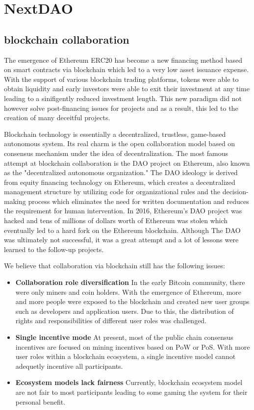 \section{NextDAO}
\subsection{blockchain collaboration}
The emergence of Ethereum ERC20 has become a new financing method based on smart contracts via blockchain which led to a very low asset issuance expense. With the support of various blockchain trading platforms, tokens were able to obtain liquidity and early investors were able to exit their investment at any time leading to a sinifigently reduced investment length. This new paradigm did not however solve post-financing issues for projects and as a result, this led to the creation of many deceitful projects.

Blockchain technology is essentially a decentralized, trustless, game-based autonomous system. Its real charm is the open collaboration model based on consensus mechanism under the idea of decentralization. The most famous attempt at blockchain collaboration is the DAO project on Ethereum, also known as the "decentralized autonomous organization." The DAO ideology is derived from equity financing technology on Ethereum, which creates a decentralized management structure by utilizing code for organizational rules and the decision-making process which eliminates the need for written documentation and reduces the requirement for human intervention. In 2016, Ethereum's DAO project was hacked and tens of millions of dollars worth of Ethereum was stolen which eventually led to a hard fork on the Ethereum blockchain. Although The DAO was ultimately not successful, it was a great attempt and a lot of lessons were learned to the follow-up projects.

We believe that collaboration via blockchain still has the following issues:
\begin{itemize}
	\item \textbf{Collaboration role diversification}
	In the early Bitcoin community, there were only miners and coin holders. With the emergence of Ethereum, more and more people were exposed to the blockchain and created new user groups such as developers and application users. Due to this, the distribution of rights and responsibilities of different user roles was challenged.
	\item \textbf{Single incentive mode}
	At present, most of the public chain consensus incentives are focused on mining incentives based on PoW or PoS. With more user roles within a blockchain ecosystem, a single incentive model cannot adequetly incentive all participants.
	\item \textbf{Ecosystem models lack fairness}
	Currently, blockchain ecosystem model are not fair to most participants leading to some gaming the system for their personal benefit.
\end{itemize}


